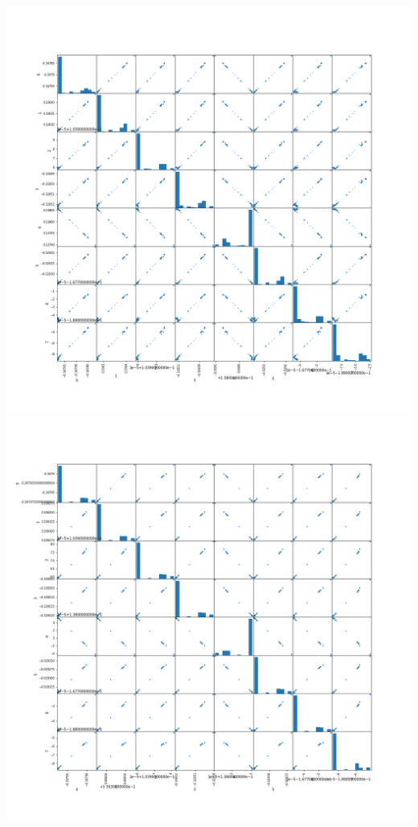 \documentclass{article}
\begin{document}
\begin{center}
\includegraphics[width=\linewidth]{200_10_0_8_25.png}
\includegraphics[width=\linewidth]{200_10_0_8_30.png}

\end{center}
\end{document}
